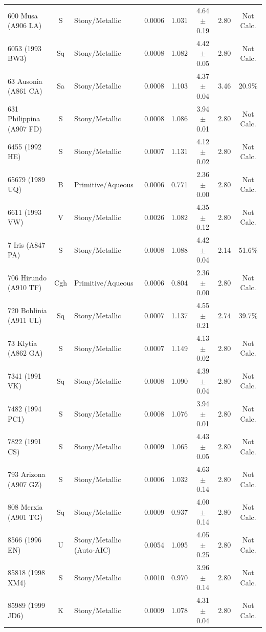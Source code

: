 {\begin{longtable}{p{2.6cm} c p{2.2cm} c c c c c}
600 Musa (A906 LA) & S & Stony/Metallic & 0.0006 & 1.031 & 4.64 $\pm$ 0.19 & 2.80 & Not Calc. \\
6053 (1993 BW3) & Sq & Stony/Metallic & 0.0008 & 1.082 & 4.42 $\pm$ 0.05 & 2.80 & Not Calc. \\
63 Ausonia (A861 CA) & Sa & Stony/Metallic & 0.0008 & 1.103 & 4.37 $\pm$ 0.04 & 3.46 & 20.9\% \\
631 Philippina (A907 FD) & S & Stony/Metallic & 0.0008 & 1.086 & 3.94 $\pm$ 0.01 & 2.80 & Not Calc. \\
6455 (1992 HE) & S & Stony/Metallic & 0.0007 & 1.131 & 4.12 $\pm$ 0.02 & 2.80 & Not Calc. \\
65679 (1989 UQ) & B & Primitive/Aqueous & 0.0006 & 0.771 & 2.36 $\pm$ 0.00 & 2.80 & Not Calc. \\
6611 (1993 VW) & V & Stony/Metallic & 0.0026 & 1.082 & 4.35 $\pm$ 0.12 & 2.80 & Not Calc. \\
7 Iris (A847 PA) & S & Stony/Metallic & 0.0008 & 1.088 & 4.42 $\pm$ 0.04 & 2.14 & 51.6\% \\
706 Hirundo (A910 TF) & Cgh & Primitive/Aqueous & 0.0006 & 0.804 & 2.36 $\pm$ 0.00 & 2.80 & Not Calc. \\
720 Bohlinia (A911 UL) & Sq & Stony/Metallic & 0.0007 & 1.137 & 4.55 $\pm$ 0.21 & 2.74 & 39.7\% \\
73 Klytia (A862 GA) & S & Stony/Metallic & 0.0007 & 1.149 & 4.13 $\pm$ 0.02 & 2.80 & Not Calc. \\
7341 (1991 VK) & Sq & Stony/Metallic & 0.0008 & 1.090 & 4.39 $\pm$ 0.04 & 2.80 & Not Calc. \\
7482 (1994 PC1) & S & Stony/Metallic & 0.0008 & 1.076 & 3.94 $\pm$ 0.01 & 2.80 & Not Calc. \\
7822 (1991 CS) & S & Stony/Metallic & 0.0009 & 1.065 & 4.43 $\pm$ 0.05 & 2.80 & Not Calc. \\
793 Arizona (A907 GZ) & S & Stony/Metallic & 0.0006 & 1.032 & 4.63 $\pm$ 0.14 & 2.80 & Not Calc. \\
808 Merxia (A901 TG) & Sq & Stony/Metallic & 0.0009 & 0.937 & 4.00 $\pm$ 0.14 & 2.80 & Not Calc. \\
8566 (1996 EN) & U & Stony/Metallic (Auto-AIC) & 0.0054 & 1.095 & 4.05 $\pm$ 0.25 & 2.80 & Not Calc. \\
85818 (1998 XM4) & S & Stony/Metallic & 0.0010 & 0.970 & 3.96 $\pm$ 0.14 & 2.80 & Not Calc. \\
85989 (1999 JD6) & K & Stony/Metallic & 0.0009 & 1.078 & 4.31 $\pm$ 0.04 & 2.80 & Not Calc. \\

\end{longtable}}
